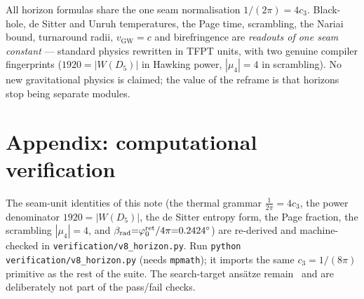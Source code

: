 \documentclass[11pt,a4paper]{article}
\newcommand{\cthree}{c_3}
\begin{document}
\begin{keybox}[Net]
All horizon formulas share the one seam normalisation $1/(2\pi)=4\cthree$. Black-hole, de Sitter and Unruh
temperatures, the Page time, scrambling, the Nariai bound, turnaround radii, $v_{\mathrm{GW}}=c$ and
birefringence are \emph{readouts of one seam constant} --- standard physics rewritten in TFPT units, with
two genuine compiler fingerprints ($1920=|W(D_5)|$ in Hawking power, $|\mu_4|=4$ in scrambling). No new
gravitational physics is claimed; the value of the reframe is that horizons stop being separate modules.
\end{keybox}

\section*{Appendix: computational verification}
The seam-unit identities of this note (the thermal grammar $\tfrac1{2\pi}{=}4\cthree$, the
power denominator $1920{=}|W(D_5)|$, the de Sitter entropy form, the Page fraction, the scrambling
$|\mu_4|{=}4$, and $\beta_{\rm rad}{=}\varphi_0^{\rm ret}/4\pi{=}0.2424^\circ$) are re-derived and machine-checked in
\texttt{verification/v8\_horizon.py}. Run \texttt{python verification/v8\_horizon.py} (needs
\texttt{mpmath}); it imports the same $\cthree{=}1/(8\pi)$ primitive as the rest of the suite. The
search-target ans\"atze remain \mO\ and are deliberately not part of the pass/fail checks.


\end{document}
